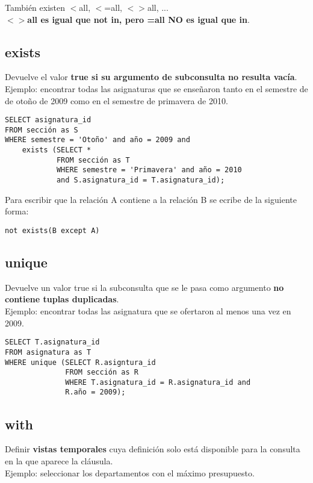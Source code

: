 \documentclass{article}
\begin{document}
También existen $<$all, $<$=all, $<>$all, ... \\
\textbf{$<>$all es igual que not in, pero =all NO es igual que in}.

\subsection{exists}
Devuelve el valor \textbf{true si su argumento de subconsulta no resulta vacía}. \\
Ejemplo: encontrar todas las asignaturas que se enseñaron tanto en el semestre de de otoño de 2009 como en el semestre de primavera de 2010.

\begin{verbatim}
SELECT asignatura_id
FROM sección as S
WHERE semestre = 'Otoño' and año = 2009 and
    exists (SELECT *
            FROM sección as T
            WHERE semestre = 'Primavera' and año = 2010
            and S.asignatura_id = T.asignatura_id);
\end{verbatim}

Para escribir que la relación A contiene a la relación B se ecribe de la siguiente forma:

\begin{verbatim}
not exists(B except A)
\end{verbatim}

\subsection{unique}
Devuelve un valor true si la subconsulta que se le pasa como argumento \textbf{no contiene tuplas duplicadas}. \\
Ejemplo: encontrar todas las asignatura que se ofertaron al menos una vez en 2009.

\begin{verbatim}
SELECT T.asignatura_id
FROM asignatura as T
WHERE unique (SELECT R.asigntura_id
              FROM sección as R
              WHERE T.asignatura_id = R.asignatura_id and
              R.año = 2009);
\end{verbatim}      

\newpage

\subsection{with}
Definir \textbf{vistas temporales} cuya definición solo está disponible para la consulta en la que aparece la cláusula. \\
Ejemplo: seleccionar los departamentos con el máximo presupuesto.
\end{document}
